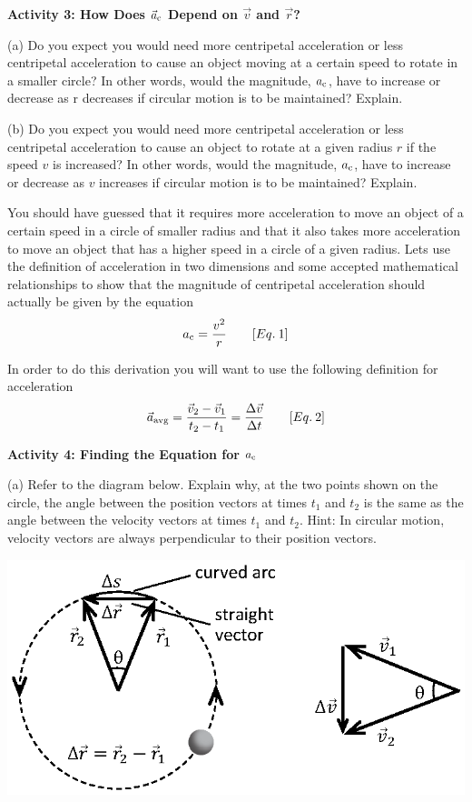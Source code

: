 \textbf{Activity 3: How Does \(\vec a _{\rm c} \) Depend on $\vec v$ and $\vec r$?} 

(a) Do you expect you would need more centripetal acceleration or less centripetal
acceleration to cause an object moving at a certain speed to rotate in a smaller
circle? In other words, would the magnitude, \( a_{\rm c} \), have to increase
or decrease as r decreases if circular motion is to be maintained? Explain.
\vspace{20mm}

(b) Do you expect you would need more centripetal acceleration or less centripetal
acceleration to cause an object to rotate at a given radius $r$ if the speed $v$
is increased? In other words, would the magnitude, \( a_{\rm c} \), have to increase
or decrease as $v$ increases if circular motion is to be maintained? Explain.
\vspace{20mm}

You should have guessed that it requires more acceleration to move an object
of a certain speed in a circle of smaller radius and that it also takes more
acceleration to move an object that has a higher speed in a circle of a given
radius. Lets use the definition of acceleration in two dimensions and some accepted
mathematical relationships to show that the magnitude of centripetal acceleration
should actually be given by the equation
\[
a_{\rm c}=\frac{v^{2}}{r}\qquad [Eq.\: 1]\]


In order to do this derivation you will want to use the following definition
for acceleration
\[
\vec a_{\rm avg} =\frac{{{\vec v}_{2}}-{{\vec v}_{1}}}{t_{2}-t_{1}}=\frac{\Delta {\vec v}}{\Delta t}\qquad [Eq.\: 2]\]


\textbf{Activity 4: Finding the Equation for \(a _{\rm c} \) }

(a) Refer to the diagram below. Explain why, at the two points shown on the
circle, the angle between the position vectors at times \( t_{1} \) and \( t_{2} \)
is the same as the angle between the velocity vectors at times \( t_{1} \)
and \( t_{2} \). Hint: In circular motion, velocity vectors are always perpendicular
to their position vectors.

\vspace{0.3cm}
{\par\raggedright \includegraphics{circ_motion/circ_motion_fig3_new.eps} \par}
\vspace{0.3cm}

